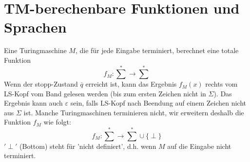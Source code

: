 \section{TM-berechenbare Funktionen und Sprachen}

Eine Turingmaschine $M$, die für jede Eingabe terminiert, berechnet eine totale Funktion $$f_M:\sum\limits^* \rightarrow \sum\limits^*$$ Wenn der stopp-Zustand $\overline{q}$ erreicht ist, kann das Ergebnis $f_M(x)$ rechts vom LS-Kopf vom Band gelesen werden (bis zum ersten Zeichen nicht in $\Sigma$). Das Ergebnis kann auch $\varepsilon$ sein,  falls LS-Kopf nach Beendung auf einem Zeichen nicht aus $\Sigma$ ist. Manche Turingmaschinen terminieren nicht, wir erweitern deshalb die Funktion $f_M$ wie folgt: $$ f_M:\sum\limits^* \rightarrow \sum\limits^* \cup \{ \perp \} $$ $'\perp'$ (Bottom) steht für 'nicht definiert', d.h. wenn $M$ auf die Eingabe nicht terminiert.